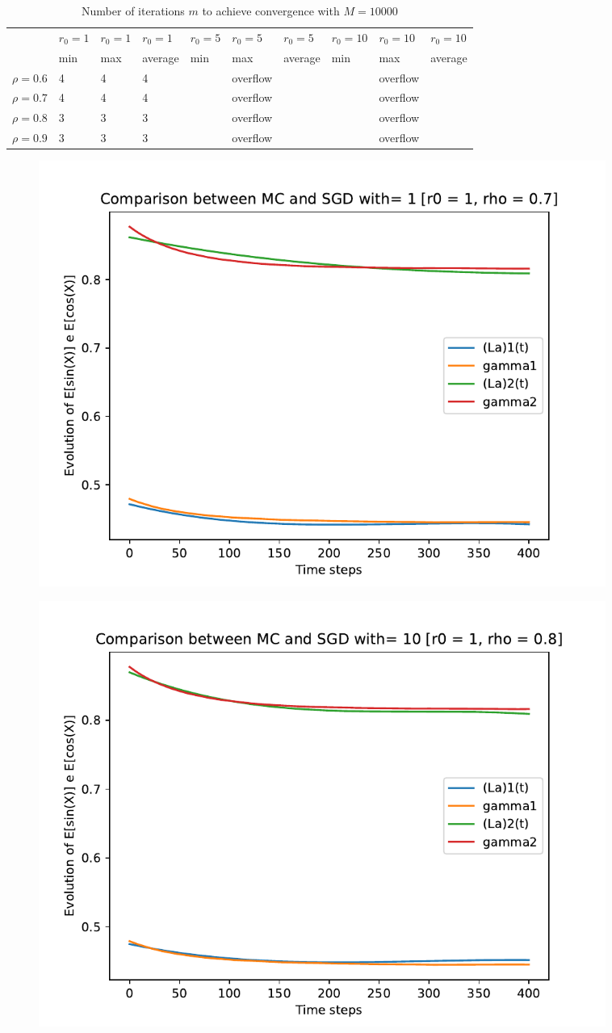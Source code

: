 \documentclass[a4paper,11pt,openright]{report}
\begin{document}
\begin{table}[H]
\centering
\addtolength{\leftskip}{-1.5cm}
\addtolength{\rightskip}{-1.5cm}
\begin{tabular}{|c|lllllllll|}
\hline
$ $ & $r_0 = 1$ & $r_0 = 1$ & $r_0 = 1$ & $r_0 = 5$ & $r_0 = 5$ & $r_0 = 5$ & $r_0 = 10$ & $r_0 = 10$ & $r_0 = 10$  \\
$ $ & min & max & average & min & max & average & min & max & average \\ 
\hline
$\rho = 0.6$ & 4 & 4 & 4 &  & overflow &  &  & overflow &  \\

$\rho = 0.7$ & 4 & 4 & 4 &  & overflow &  &  & overflow &  \\

$\rho = 0.8$ & 3 & 3 & 3 &  & overflow &  &  & overflow & \\

$\rho = 0.9$ & 3 & 3 & 3 &  & overflow &  &  & overflow & \\
\hline
\end{tabular}
\caption{Number of iterations $m$ to achieve convergence with $M = 10000$}
\end{table}
\begin{figure}[H]
\centering
\includegraphics[width=0.9\textwidth]{images/graphs T = 4/n = 3, M = 1 sine and cosine.pdf}
\end{figure}
\begin{figure}[H]
\centering
\includegraphics[width=0.9\textwidth]{images/graphs T = 4/n = 3, M = 10 sine and cosine.pdf}
\end{figure}
\end{document}

